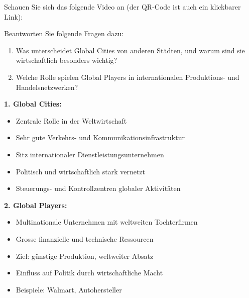 \begin{myexercise}
Schauen Sie sich das folgende Video an (der QR-Code ist auch ein klickbarer Link): 


Beantworten Sie folgende Fragen dazu:
\begin{enumerate}
\item Was unterscheidet Global Cities von anderen Städten, und warum sind sie wirtschaftlich besonders wichtig?
\item Welche Rolle spielen Global Players in internationalen Produktions- und Handelsnetzwerken?
\end{enumerate}
\begin{myanswer} 
\textbf{1. Global Cities:}
\begin{itemize} 
\item Zentrale Rolle in der Weltwirtschaft
\item Sehr gute Verkehrs- und Kommunikationsinfrastruktur
\item Sitz internationaler Dienstleistungsunternehmen
\item Politisch und wirtschaftlich stark vernetzt
\item Steuerungs- und Kontrollzentren globaler Aktivitäten
\end{itemize}

\textbf{2. Global Players:}
\begin{itemize} \item Multinationale Unternehmen mit weltweiten Tochterfirmen
\item Grosse finanzielle und technische Ressourcen
\item Ziel: günstige Produktion, weltweiter Absatz
\item Einfluss auf Politik durch wirtschaftliche Macht
\item Beispiele: Walmart, Autohersteller
\end{itemize} 
\end{myanswer}
\end{myexercise}

